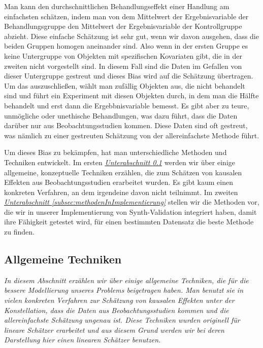 \documentclass[12pt,a4paper,twoside]{scrartcl}
\numberwithin{equation}{section}
\begin{document}
Man kann den durchschnittlichen Behandlungseffekt einer Handlung am einfachsten schätzen, indem man von dem Mittelwert der Ergebnisvariable der Behandlungsgruppe den Mittelwert der Ergebnisvariable der Kontrollgruppe abzieht. Diese einfache Schätzung ist sehr gut, wenn wir davon ausgehen, dass die beiden Gruppen homogen aneinander sind. Also wenn in der ersten Gruppe es keine Untergruppe von Objekten mit spezifischen Kovariaten gibt, die in der zweiten nicht vorgestellt sind. In diesem Fall sind die Daten im Gefallen von dieser Untergruppe gestreut und dieses Bias wird auf die Schätzung übertragen. Um das auszuschließen, wählt man zufällig Objekten aus, die nicht behandelt sind und führt ein Experiment mit diesen Objekten durch, in dem man die Hälfte behandelt und erst dann die Ergebbnisvariable bemesst. Es gibt aber zu teure, unmögliche oder unethische Behandlungen, was dazu führt, dass die Daten darüber nur aus Beobachtungsstudien kommen. Diese Daten sind oft gestreut, was nämlich zu einer gestreuten Schätzung von der allereinfachste Methode führt\cite{cox1982biometrics}.\par 

\noindent
Um dieses Bias zu bekämpfen, hat man unterschiedliche Methoden und Techniken entwickelt. Im ersten  \emph{\hyperref[subsec:allgemeineTechniken]{Unterabschnitt \ref{subsec:allgemeineTechniken}}} werden wir über einige allgemeine, konzeptuelle Techniken erzählen, die zum Schätzen von kausalen Effekten aus Beobachtungsstudien erarbeitet wurden. Es gibt kaum einen konkreten Verfahren, an dem irgendeine davon nicht teilnimmt. Im zweiten \emph{\hyperref[subsec:methodenInImplementierung]{Unterabschnitt \ref{subsec:methodenInImplementierung}}} stellen wir die Methoden vor, die wir in unserer Implementierung von Synth-Validation integriert haben, damit ihre Fähigkeit getestet wird, für einen bestimmten Datensatz die beste Methode zu finden.\par 
  
\subsection{Allgemeine Techniken}\label{subsec:allgemeineTechniken} 
\noindent
\emph{In diesem Abschnitt erzählen wir über einige allgemeine Techniken, die für die bessere Modellierung unseres Problems beigetragen haben. Man benutzt sie in vielen konkreten Verfahren zur Schätzung von kausalen Effekten unter der Konstellation, dass die Daten aus Beobachtungsstudien kommen und die allereinfachste Schätzung ungenau ist. Diese Techniken wurden originell für lineare Schätzer erarbeitet und aus diesem Grund werden wir bei deren Darstellung hier einen linearen Schätzer benutzen.}
\par
 
\end{document}
